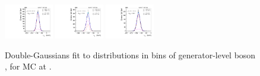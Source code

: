 \begin{figure}[htb]
\includegraphics[width=0.19\textwidth]{plots/Appendix_Recoil_Fits/WmpMC_PF_13TeV_2G/pfu1fit_33.pdf}
\includegraphics[width=0.19\textwidth]{plots/Appendix_Recoil_Fits/WmpMC_PF_13TeV_2G/pfu1fit_34.pdf}
\includegraphics[width=0.19\textwidth]{plots/Appendix_Recoil_Fits/WmpMC_PF_13TeV_2G/pfu1fit_35.pdf}
\caption{Double-Gaussians fit to \upar distributions in bins of generator-level boson \pt, for \Wp MC at \serah.}
\label{fig:a:recoil:fit:wp:u1:13}
\end{figure}